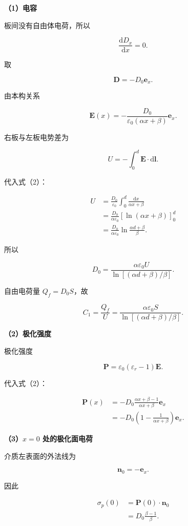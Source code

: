 \documentclass[12pt,a4paper,UTF8]{ctexart}
\begin{document}
\textbf{（1）电容}

板间没有自由体电荷，所以

\[
\frac{\mathrm dD_x}{\mathrm dx}=0.
\]

取

\[
\bm D=-D_0\bm e_x.
\tag{1}
\]

由本构关系

\[
\bm E(x)
=-\frac{D_0}{\varepsilon_0(\alpha x+\beta)}\bm e_x.
\tag{2}
\]

右板与左板电势差为

\[
U=-\int_0^d\bm E\cdot\mathrm d\bm l.
\]

代入式（2）：

\[
\begin{aligned}
U
&=\frac{D_0}{\varepsilon_0}
\int_0^d\frac{\mathrm dx}{\alpha x+\beta}\\
&=\frac{D_0}{\alpha\varepsilon_0}
\left[\ln(\alpha x+\beta)\right]_0^d\\
&=\frac{D_0}{\alpha\varepsilon_0}
\ln\frac{\alpha d+\beta}{\beta}.
\end{aligned}
\tag{3}
\]

所以

\[
D_0
=\frac{\alpha\varepsilon_0U}
{\ln[(\alpha d+\beta)/\beta]}.
\tag{4}
\]

自由电荷量 \(Q_f=D_0S\)，故

\[
\boxed{
C_1=\frac{Q_f}{U}
=\frac{\alpha\varepsilon_0S}
{\ln[(\alpha d+\beta)/\beta]}
}.
\tag{5}
\]

\textbf{（2）极化强度}

极化强度

\[
\bm P
=\varepsilon_0(\varepsilon_r-1)\bm E.
\]

代入式（2）：

\[
\begin{aligned}
\bm P(x)
&=-D_0
\frac{\alpha x+\beta-1}{\alpha x+\beta}\bm e_x\\
&=-D_0\left(1-\frac1{\alpha x+\beta}\right)\bm e_x.
\end{aligned}
\tag{6}
\]

\textbf{（3）\(x=0\) 处的极化面电荷}

介质左表面的外法线为

\[
\bm n_0=-\bm e_x.
\]

因此

\[
\begin{aligned}
\sigma_p(0)
&=\bm P(0)\cdot\bm n_0\\
&=D_0\frac{\beta-1}{\beta}.
\end{aligned}
\]
\end{document}
